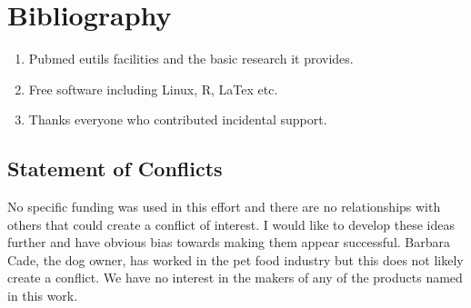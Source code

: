 \section{Bibliography}






\begin{acknowledgments} 

% 
\begin{enumerate}
\item Pubmed eutils facilities and the basic research it provides. 
\item Free software including Linux, R, LaTex  etc.
\item Thanks everyone who contributed incidental support. 
\end{enumerate}

\end{acknowledgments}

\clearpage
\appendix

\begin{mdpicomment}

\section{ Statement of Conflicts }
 No specific funding was used in this effort and there are no relationships
with others that could create a conflict of interest. I would like to develop
these ideas further and have obvious bias towards making them appear 
successful. Barbara Cade, the dog owner, has worked in the pet food industry
but this does not likely create a conflict. We have no interest in the
makers of any of the products named in this work.  

\end{mdpicomment}


